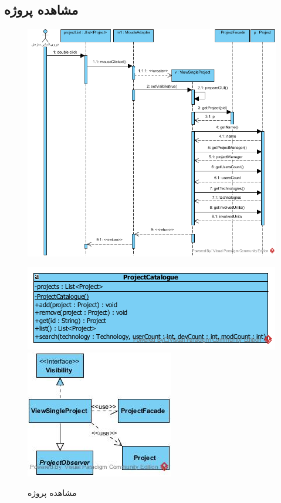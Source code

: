 \begin{landscape}
\section{مشاهده پروژه}
\begin{figure}[H]
	\centering
	\includegraphics[scale=0.7]{img/sequence-design/ViewProject}
\end{figure}
\begin{figure}[H]
	\centering
	\includegraphics[scale=0.5]{img/sequence-design/ViewProjectC}
	\includegraphics[scale=0.8]{img/sequence-design/ViewProjectUI}
	\caption{مشاهده پروژه}
\end{figure}


\end{landscape}
